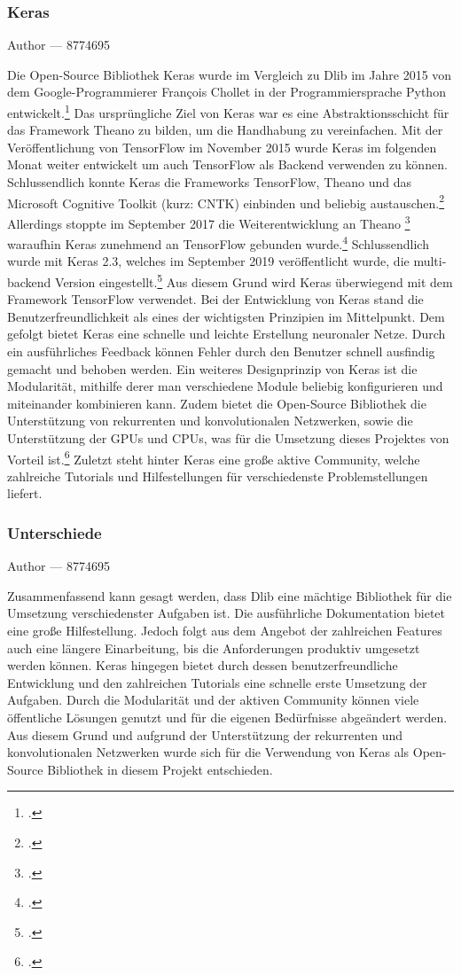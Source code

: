 \documentclass[12pt, a4paper]{report}
\makeatletter
\newcommand{\sectionauthor}[1]{%
  {\parindent0pt\vspace*{-5pt}%
  \large{Author --- }
  \linespread{1.1}\large\scshape#1%
  \par\nobreak\vspace*{35pt} }
  \@afterheading%
}
\makeatother
\begin{document}
\subsubsection{Keras}
\sectionauthor{8774695}
Die Open-Source Bibliothek Keras wurde im Vergleich zu Dlib im Jahre 2015 von dem Google-Programmierer François Chollet in der Programmiersprache Python entwickelt.\footcite[Vgl.][]{Keras}
Das ursprüngliche Ziel von Keras war es eine Abstraktionsschicht für das Framework Theano zu bilden, um die Handhabung zu vereinfachen. Mit der Veröffentlichung von TensorFlow im November 2015 wurde Keras im folgenden Monat weiter entwickelt um auch TensorFlow als Backend verwenden zu können. Schlussendlich konnte Keras die Frameworks TensorFlow, Theano und das Microsoft Cognitive Toolkit (kurz: CNTK) einbinden und beliebig austauschen.\footcite[Vgl.][]{Keras3} Allerdings stoppte im September 2017 die Weiterentwicklung an Theano
\footcite[Vgl.][]{Theano}
 waraufhin Keras zunehmend an TensorFlow gebunden wurde.\footcite[Vgl.][]{Keras4} Schlussendlich wurde mit Keras 2.3, welches im September 2019 veröffentlicht wurde, die multi-backend Version eingestellt.\footcite[Vgl.][]{Keras5} Aus diesem Grund wird Keras überwiegend mit dem Framework TensorFlow verwendet.
\newline
Bei der Entwicklung von Keras stand die Benutzerfreundlichkeit als eines der wichtigsten Prinzipien im Mittelpunkt. Dem gefolgt bietet Keras eine schnelle und leichte Erstellung neuronaler Netze. Durch ein ausführliches Feedback können Fehler durch den Benutzer schnell ausfindig gemacht und behoben werden. Ein weiteres Designprinzip von Keras ist die Modularität, mithilfe derer man verschiedene Module beliebig konfigurieren und miteinander kombinieren kann. Zudem bietet die Open-Source Bibliothek die Unterstützung von rekurrenten und konvolutionalen Netzwerken, sowie die Unterstützung der GPUs und CPUs, was für die Umsetzung dieses Projektes von Vorteil ist.\footcite[Vgl.][]{Keras2}
Zuletzt steht hinter Keras eine große aktive Community, welche zahlreiche Tutorials und Hilfestellungen für verschiedenste Problemstellungen liefert.


\subsubsection{Unterschiede}
\sectionauthor{8774695}
Zusammenfassend kann gesagt werden, dass Dlib eine mächtige Bibliothek für die Umsetzung verschiedenster Aufgaben ist. Die ausführliche Dokumentation bietet eine große Hilfestellung. Jedoch folgt aus dem Angebot der zahlreichen Features auch eine längere Einarbeitung, bis die Anforderungen produktiv umgesetzt werden können.\newline
Keras hingegen bietet durch dessen benutzerfreundliche Entwicklung und den zahlreichen Tutorials eine schnelle erste Umsetzung der Aufgaben. Durch die Modularität und der aktiven Community können viele öffentliche Lösungen genutzt und für die eigenen Bedürfnisse abgeändert werden. 
Aus diesem Grund und aufgrund der Unterstützung der rekurrenten und konvolutionalen Netzwerken wurde sich für die Verwendung von Keras als Open-Source Bibliothek in diesem Projekt entschieden.
\end{document}
